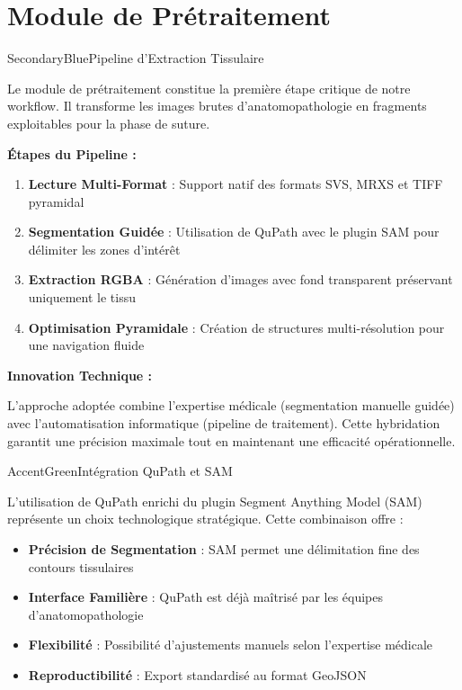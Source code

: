 \documentclass[11pt,a4paper]{article}
\begin{document}
\section{Module de Prétraitement}

\begin{subsectionbox}{SecondaryBlue}{Pipeline d'Extraction Tissulaire}

Le module de prétraitement constitue la première étape critique de notre workflow. Il transforme les images brutes d'anatomopathologie en fragments exploitables pour la phase de suture.

\textbf{Étapes du Pipeline :}

\begin{enumerate}[leftmargin=*]
    \item \textbf{Lecture Multi-Format} : Support natif des formats SVS, MRXS et TIFF pyramidal
    \item \textbf{Segmentation Guidée} : Utilisation de QuPath avec le plugin SAM pour délimiter les zones d'intérêt
    \item \textbf{Extraction RGBA} : Génération d'images avec fond transparent préservant uniquement le tissu
    \item \textbf{Optimisation Pyramidale} : Création de structures multi-résolution pour une navigation fluide
\end{enumerate}

\textbf{Innovation Technique :}

L'approche adoptée combine l'expertise médicale (segmentation manuelle guidée) avec l'automatisation informatique (pipeline de traitement). Cette hybridation garantit une précision maximale tout en maintenant une efficacité opérationnelle.

\end{subsectionbox}

\begin{subsectionbox}{AccentGreen}{Intégration QuPath et SAM}

L'utilisation de QuPath enrichi du plugin Segment Anything Model (SAM) représente un choix technologique stratégique. Cette combinaison offre :

\begin{itemize}[leftmargin=*]
    \item \textbf{Précision de Segmentation} : SAM permet une délimitation fine des contours tissulaires
    \item \textbf{Interface Familière} : QuPath est déjà maîtrisé par les équipes d'anatomopathologie
    \item \textbf{Flexibilité} : Possibilité d'ajustements manuels selon l'expertise médicale
    \item \textbf{Reproductibilité} : Export standardisé au format GeoJSON
\end{itemize}

\end{subsectionbox}
\end{document}
